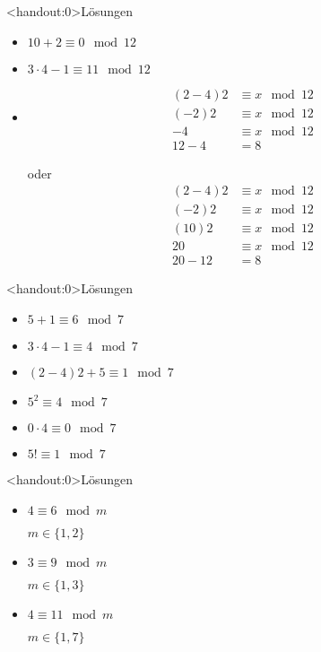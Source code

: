 {\begin{frame}<handout:0>{Lösungen}
  \begin{itemize}[<+- | alert@+>]
        \item $10+2 \equiv 0 \mod 12$
        \item $3\cdot 4-1 \equiv 11 \mod 12$
        \item 
        \begin{align*}
        (2-4)2 &\equiv x \mod 12\\
        (-2)2 &\equiv x \mod 12\\
        -4 &\equiv x \mod 12\\
        12-4&=8
        \end{align*}

        oder
        \begin{align*}
        (2-4)2 &\equiv x \mod 12\\
        (-2)2 &\equiv x \mod 12\\
        (10)2 &\equiv x \mod 12\\
        20 &\equiv x \mod 12\\
        20-12 &= 8 
        \end{align*}
    \end{itemize}
\end{frame}

\begin{frame}<handout:0>{Lösungen}
  \begin{itemize}[<+- | alert@+>]
                \item $5 + 1      \equiv 6 \mod 7$
                \item $3\cdot4-1  \equiv 4 \mod 7$
                \item $(2-4)2+5   \equiv 1 \mod 7$
                \item $5^2        \equiv 4 \mod 7$
                \item $0\cdot4    \equiv 0 \mod 7$
                \item $5!         \equiv 1 \mod 7$
    \end{itemize}
\end{frame}

\begin{frame}<handout:0>{Lösungen}
  \begin{itemize}[<+- | alert@+>]
                \item $4 \equiv 6 \mod m$
                
                $m \in \{1,2\}$
                \item $3 \equiv 9 \mod m$

                $m \in \{1,3\}$
                \item $4 \equiv 11 \mod m$

                $m \in \{1,7\}$
    \end{itemize}
\end{frame}
}

